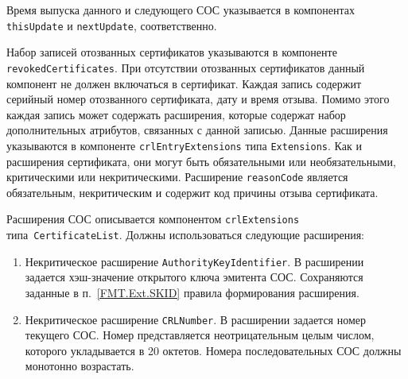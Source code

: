 Время выпуска данного и следующего СОС указывается в 
компонентах \texttt{thisUpdate} и \texttt{nextUpdate}, 
соответственно.

Набор записей отозванных сертификатов указываются в компоненте 
\texttt{revokedCertificates}. При отсутствии отозванных  
сертификатов данный компонент не должен включаться в сертификат.
Каждая запись содержит серийный номер отозванного 
сертификата, дату и время отзыва. Помимо этого
каждая запись может содержать расширения, которые содержат
набор дополнительных атрибутов, связанных с данной записью. 
Данные расширения указываются в компоненте 
\texttt{crlEntryExtensions} типа \texttt{Extensions}. Как 
и расширения сертификата, они могут быть обязательными или необязательными,
критическими или некритическими. Расширение \texttt{reasonCode}
является обязательным, некритическим и содержит код причины 
отзыва сертификата.  

Расширения СОС описывается компонентом \texttt{crlExtensions}
типа~\texttt{CertificateList}. Должны использоваться следующие расширения: 
\begin{enumerate}
\item 
Некритическое расширение \texttt{AuthorityKeyIdentifier}. 
В расширении задается хэш-значение открытого ключа эмитента СОС.
Сохраняются заданные в п.~\ref{FMT.Ext.SKID} правила формирования 
расширения.

\item
Некритическое расширение \texttt{CRLNumber}. 
В расширении задается номер текущего СОС.
Номер представляется неотрицательным целым числом, 
 которого укладывается в 20 октетов. 
Номера последовательных СОС должны монотонно возрастать.
\end{enumerate}
